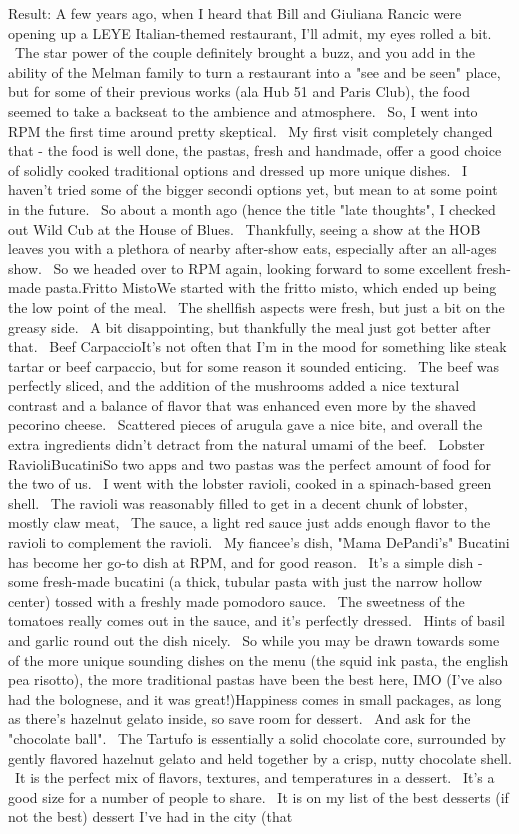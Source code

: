 \documentclass[paper=a4, fontsize=11pt]{jhwhw} %
\begin{document}
\begin{itemize}
\begin{enumerate}
Result: A few years ago, when I heard that Bill and Giuliana Rancic were opening up a LEYE Italian-themed restaurant, I'll admit, my eyes rolled a bit.  The star power of the couple definitely brought a buzz, and you add in the ability of the Melman family to turn a restaurant into a "see and be seen" place, but for some of their previous works (ala Hub 51 and Paris Club), the food seemed to take a backseat to the ambience and atmosphere.  So, I went into RPM the first time around pretty skeptical.  My first visit completely changed that - the food is well done, the pastas, fresh and handmade, offer a good choice of solidly cooked traditional options and dressed up more unique dishes.  I haven't tried some of the bigger secondi options yet, but mean to at some point in the future.  So about a month ago (hence the title "late thoughts", I checked out Wild Cub at the House of Blues.  Thankfully, seeing a show at the HOB leaves you with a plethora of nearby after-show eats, especially after an all-ages show.  So we headed over to RPM again, looking forward to some excellent fresh-made pasta.Fritto MistoWe started with the fritto misto, which ended up being the low point of the meal.  The shellfish aspects were fresh, but just a bit on the greasy side.  A bit disappointing, but thankfully the meal just got better after that.  Beef CarpaccioIt's not often that I'm in the mood for something like steak tartar or beef carpaccio, but for some reason it sounded enticing.  The beef was perfectly sliced, and the addition of the mushrooms added a nice textural contrast and a balance of flavor that was enhanced even more by the shaved pecorino cheese.  Scattered pieces of arugula gave a nice bite, and overall the extra ingredients didn't detract from the natural umami of the beef.  Lobster RavioliBucatiniSo two apps and two pastas was the perfect amount of food for the two of us.  I went with the lobster ravioli, cooked in a spinach-based green shell.  The ravioli was reasonably filled to get in a decent chunk of lobster, mostly claw meat,  The sauce, a light red sauce just adds enough flavor to the ravioli to complement the ravioli.  My fiancee's dish, "Mama DePandi's" Bucatini has become her go-to dish at RPM, and for good reason.  It's a simple dish - some fresh-made bucatini (a thick, tubular pasta with just the narrow hollow center) tossed with a freshly made pomodoro sauce.  The sweetness of the tomatoes really comes out in the sauce, and it's perfectly dressed.  Hints of basil and garlic round out the dish nicely.  So while you may be drawn towards some of the more unique sounding dishes on the menu (the squid ink pasta, the english pea risotto), the more traditional pastas have been the best here, IMO (I've also had the bolognese, and it was great!)Happiness comes in small packages, as long as there's hazelnut gelato inside, so save room for dessert.  And ask for the "chocolate ball".  The Tartufo is essentially a solid chocolate core, surrounded by gently flavored hazelnut gelato and held together by a crisp, nutty chocolate shell.  It is the perfect mix of flavors, textures, and temperatures in a dessert.  It's a good size for a number of people to share.  It is on my list of the best desserts (if not the best) dessert I've had in the city (that 
\end{enumerate}
\end{itemize}
\end{document}
